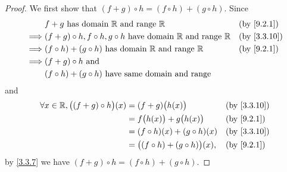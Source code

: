 \begin{proof}
  We first show that \((f + g) \circ h = (f \circ h) + (g \circ h)\).
  Since
  \begin{align*}
             & f + g \text{ has domain } \R \text{ and range } \R                                   &  & \by{9.2.1}                \\
    \implies & (f + g) \circ h, f \circ h, g \circ h  \text{ have domain } \R \text{ and range } \R &  & \text{(by \cref{3.3.10})} \\
    \implies & (f \circ h) + (g \circ h)  \text{ has domain } \R \text{ and range } \R              &  & \by{9.2.1}                \\
    \implies & (f + g) \circ h \text{ and }                                                                                        \\
             & (f \circ h) + (g \circ h) \text{ have same domain and range}
  \end{align*}
  and
  \begin{align*}
    \forall x \in \R, \big((f + g) \circ h\big)(x) & = (f + g)\big(h(x)\big)                   &  & \text{(by \cref{3.3.10})} \\
                                                   & = f\big(h(x)\big) + g\big(h(x)\big)       &  & \by{9.2.1}                \\
                                                   & = (f \circ h)(x) + (g \circ h)(x)         &  & \text{(by \cref{3.3.10})} \\
                                                   & = \big((f \circ h) + (g \circ h)\big)(x), &  & \by{9.2.1}
  \end{align*}
  by \cref{3.3.7} we have \((f + g) \circ h = (f \circ h) + (g \circ h)\).


\end{proof}
